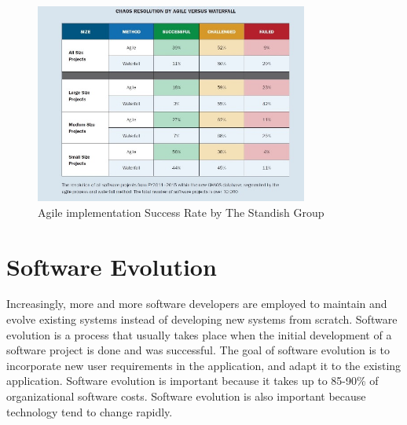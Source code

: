 \begin{figure}
	\centering
	\includegraphics[width=0.8\textwidth]{images/Agile-Waterfall-Success-Failure-Rates.jpg}
	\caption{Agile implementation Success Rate by The Standish Group}
	\label{fig:agileWaterfallSuccessFailureRates}
\end{figure}









\section{Software Evolution}
\label{sec:2-SE}
Increasingly, more and more software developers are employed to maintain and evolve existing systems instead of developing new systems from scratch\cite{Sommerville:2011:SE}. Software evolution is a process that usually takes place when the initial development of a software project is done and was successful\cite{Bennett:2000:SME:336512.336534}. The goal of software evolution is to incorporate new user requirements in the application, and adapt it to the existing application. Software evolution is important because it takes up to 85-90\% of organizational software costs\cite{Sommerville:2011:SE}. Software evolution is also important because technology tend to change rapidly.

